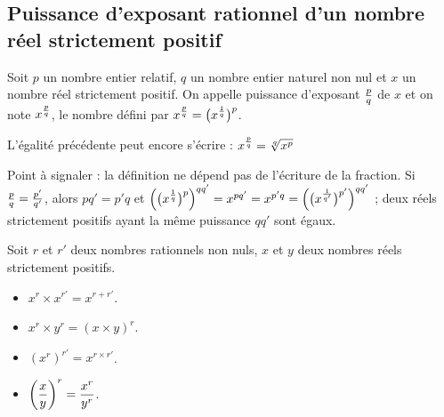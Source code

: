 \subsection{Puissance d'exposant rationnel d'un nombre réel strictement positif}
\begin{definition}
	Soit $p$ un nombre entier relatif, $q$ un nombre entier
	naturel non nul et $x$ un nombre réel strictement positif.
	On appelle puissance d’exposant $\frac{p}{q}$ de $x$ et on note $x^{\frac{p}{q}}$, le nombre défini par $x^{\frac{p}{q}}=\big(x^{\frac{1}{q}}\big)^p$.
	\par L'égalité précédente peut encore s'écrire : $x^{\frac{p}{q}}=\sqrt[q]{x^p}$
\end{definition}
\begin{noteprof}
Point à signaler : la définition ne dépend pas de l'écriture de la fraction. Si $\frac{p}{q}=\frac{p'}{q'}$, alors $pq'=p'q$ et $\Big(\big(x^{\frac{1}{q}}\big)^p\Big)^{qq'}=x^{pq'}=x^{p'q}=\Big(\big(x^{\frac{1}{q'}}\big)^{p'}\Big)^{qq'}$ ; deux réels strictement positifs ayant la même puissance $qq'$ sont égaux.
\end{noteprof}
\hspace*{-0.8cm}
\begin{propriete}[s]
	Soit $r$ et $r'$ deux nombres rationnels non nuls, $x$ et $y$ deux nombres réels strictement positifs.
	\begin{itemize}
		\item $x^r\times x^{r'}=x^{r+r'}$.
		\item $x^r\times y^r=(x\times y)^r$.
		\item $(x^r)^{r'}=x^{r\times r'}$.
		\item $\bigg(\dfrac{x}{y}\bigg)^r=\dfrac{x^r}{y^r}$.
	\end{itemize}
\end{propriete}

\newpage
\fi %
